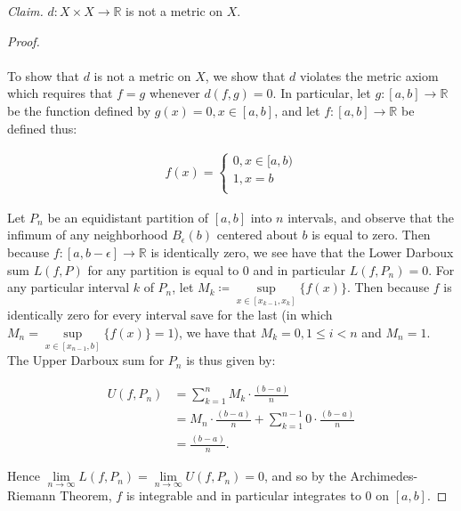     \emph{Claim.} $d: X \times X \to \mathbb{R}$ is not a metric on $X$.
    \ \\

    \begin{proof}\ \\\\
        To show that $d$ is not a metric on $X$, we show that $d$ violates the metric axiom which requires
        that $f = g$ whenever $d(f, g) = 0$. In particular, let $g:[a, b] \to \mathbb{R}$ be the function defined
        by $g(x) = 0, x \in [a, b]$, and let $f:[a, b] \to \mathbb{R}$ be defined thus:

        \begin{align*}
            f(x) = \begin{cases}
                0, x \in [a, b) \\
                1, x = b \\
            \end{cases}
        \end{align*}

        Let $P_n$ be an equidistant partition of $[a, b]$ into $n$ intervals, and observe that the infimum of any 
        neighborhood $B_{\epsilon}(b)$ centered about $b$ is equal to zero. Then because 
        $f:[a, b - \epsilon] \to \mathbb{R}$ is identically zero, we see have that the Lower Darboux sum $L(f, P)$
        for any partition is equal to 0 and in particular $L(f, P_n) = 0$. For any particular interval $k$ of $P_n$, let 
        $M_k \coloneqq \sup\limits_{x \in [x_{k-1}, x_{k}]}{\{f(x)\}}$. Then because $f$ is identically zero for every 
        interval save for the last (in which $M_n = \sup\limits_{x \in [x_{n-1}, b]}{\{f(x)\}} = 1$), we have that 
        $M_k = 0, 1 \le i < n$ and $M_n = 1$. The Upper Darboux sum for $P_n$ is thus given by:

        \begin{align*}
            U(f, P_n) &= \sum\limits_{k=1}^{n}{M_k \cdot \frac{(b - a)}{n}} \\
                      &= M_n \cdot \frac{(b - a)}{n} + \sum\limits_{k=1}^{n-1}{0 \cdot \frac{(b - a)}{n}} \\
                      &= \frac{(b - a)}{n}.
        \end{align*}

        Hence $\lim\limits_{n \to \infty}{L(f, P_n)} = \lim\limits_{n \to \infty}{U(f, P_n)} = 0$, and so by the 
        Archimedes-Riemann Theorem, $f$ is integrable and in particular integrates to 0 on $[a, b]$.
        

\end{proof}
